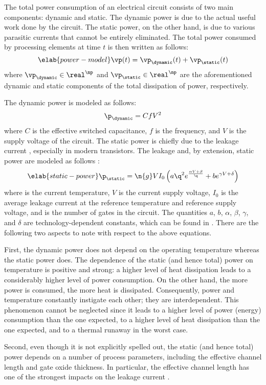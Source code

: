 The total power consumption of an electrical circuit consists of two main
components: dynamic and static. The dynamic power is due to the actual useful
work done by the circuit. The static power, on the other hand, is due to various
parasitic currents that cannot be entirely eliminated. The total power consumed
by \np processing elements at time $t$ is then written as follows:
\begin{equation} \elab{power-model}
  \vp(t) = \vp_\dynamic(t) + \vp_\static(t)
\end{equation}
where $\vp_\dynamic \in \real^\np$ and $\vp_\static \in \real^\np$ are the
aforementioned dynamic and static components of the total dissipation of power,
respectively.

The dynamic power is modeled as follows:
\[
  \p_\dynamic = C f V^2
\]
where $C$ is the effective switched capacitance, $f$ is the frequency, and $V$
is the supply voltage of the circuit. The static power is chiefly due to the
leakage current \cite{chandrakasan2000, srivastava2010, juan2011, juan2012},
especially in modern  transistors. The leakage and, by extension,
static power are modeled as follows \cite{liao2005}:
\begin{equation} \elab{static-power}
  \p_\static = \n{g} V I_0 \left(a \q^2 e^{\frac{\alpha V + \beta}{\q}} + b e^{\gamma V + \delta}\right)
\end{equation}
where \q is the current temperature, $V$ is the current supply voltage, $I_0$ is
the average leakage current at the reference temperature and reference supply
voltage, and  is the number of gates in the circuit. The quantities $a$,
$b$, $\alpha$, $\beta$, $\gamma$, and $\delta$ are technology-dependent
constants, which can be found in \cite{liao2005}. There are the following two
aspects to note with respect to the above equations.

First, the dynamic power does not depend on the operating temperature whereas
the static power does. The dependence of the static (and hence total) power on
temperature is positive and strong: a higher level of heat dissipation leads to
a considerably higher level of power consumption. On the other hand, the more
power is consumed, the more heat is dissipated. Consequently, power and
temperature constantly instigate each other; they are interdependent. This
phenomenon cannot be neglected since it leads to a higher level of power
(energy) consumption than the one expected, to a higher level of heat
dissipation than the one expected, and to a thermal runaway in the worst case.

Second, even though it is not explicitly spelled out, the static (and hence
total) power depends on a number of process parameters, including the effective
channel length and gate oxide thickness. In particular, the effective channel
length has one of the strongest impacts on the leakage current \cite{juan2012}.
